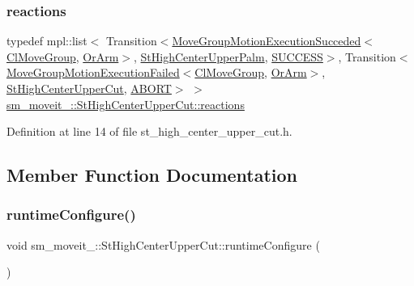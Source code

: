 \subsubsection{\texorpdfstring{reactions}{reactions}}
{\footnotesize\ttfamily typedef mpl\+::list$<$ Transition$<$\hyperlink{structmove__group__interface__client_1_1MoveGroupMotionExecutionSucceded}{Move\+Group\+Motion\+Execution\+Succeded}$<$\hyperlink{classmove__group__interface__client_1_1ClMoveGroup}{Cl\+Move\+Group}, \hyperlink{classsm__moveit__3_1_1OrArm}{Or\+Arm}$>$, \hyperlink{structsm__moveit__3_1_1StHighCenterUpperPalm}{St\+High\+Center\+Upper\+Palm}, \hyperlink{classSUCCESS}{S\+U\+C\+C\+E\+SS}$>$, Transition$<$\hyperlink{structmove__group__interface__client_1_1MoveGroupMotionExecutionFailed}{Move\+Group\+Motion\+Execution\+Failed}$<$\hyperlink{classmove__group__interface__client_1_1ClMoveGroup}{Cl\+Move\+Group}, \hyperlink{classsm__moveit__3_1_1OrArm}{Or\+Arm}$>$, \hyperlink{structsm__moveit__3_1_1StHighCenterUpperCut}{St\+High\+Center\+Upper\+Cut}, \hyperlink{classABORT}{A\+B\+O\+RT}$>$ $>$ \hyperlink{structsm__moveit__3_1_1StHighCenterUpperCut_a91b32fdc7c44562edaaf5ff024e95505}{sm\+\_\+moveit\+\_\+::\+St\+High\+Center\+Upper\+Cut\+::reactions}}



Definition at line 14 of file st\+\_\+high\+\_\+center\+\_\+upper\+\_\+cut.\+h.



\subsection{Member Function Documentation}
\mbox{\label{structsm__moveit__3_1_1StHighCenterUpperCut_abf028817092539f6ba633e750d322bf0}} 
\subsubsection{\texorpdfstring{runtime\+Configure()}{runtimeConfigure()}}
{\footnotesize\ttfamily void sm\+\_\+moveit\+\_\+::\+St\+High\+Center\+Upper\+Cut\+::runtime\+Configure (\begin{DoxyParamCaption}{ }\end{DoxyParamCaption})\hspace{0.3cm}{\ttfamily [inline]}}




